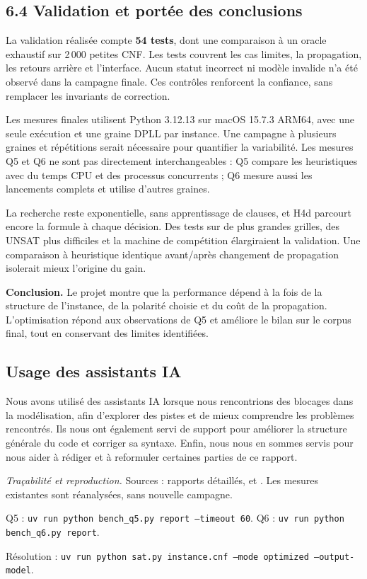 \documentclass[11pt,a4paper]{article}
\begin{document}
\subsection*{6.4 Validation et portée des conclusions}

La validation réalisée compte \textbf{54 tests}, dont une comparaison à
un oracle exhaustif sur 2\,000 petites CNF. Les tests couvrent les cas
limites, la propagation, les retours arrière et l'interface. Aucun statut
incorrect ni modèle invalide n'a été observé dans la campagne finale.
Ces contrôles renforcent la confiance, sans remplacer les invariants
de correction.

Les mesures finales utilisent Python 3.12.13 sur macOS 15.7.3 ARM64,
avec une seule exécution et une graine DPLL par instance. Une campagne
à plusieurs graines et répétitions serait nécessaire pour quantifier
la variabilité. Les mesures Q5 et Q6 ne sont pas directement interchangeables :
Q5 compare les heuristiques avec du temps CPU et des processus concurrents ;
Q6 mesure aussi les lancements complets et utilise d'autres graines.

La recherche reste exponentielle, sans apprentissage de clauses, et H4d
parcourt encore la formule à chaque décision. Des tests sur de plus grandes
grilles, des UNSAT plus difficiles et la machine de compétition élargiraient
la validation. Une comparaison à heuristique identique avant/après
changement de propagation isolerait mieux l'origine du gain.

\textbf{Conclusion.} Le projet montre que la performance dépend à la fois
de la structure de l'instance, de la polarité choisie et du coût de la
propagation. L'optimisation répond aux observations de Q5 et améliore
le bilan sur le corpus final, tout en conservant des limites identifiées.

\subsection*{Usage des assistants IA}

Nous avons utilisé des assistants IA lorsque nous rencontrions des blocages
dans la modélisation, afin d'explorer des pistes et de mieux comprendre les
problèmes rencontrés. Ils nous ont également servi de support pour améliorer
la structure générale du code et corriger sa syntaxe. Enfin, nous nous en
sommes servis pour nous aider à rédiger et à reformuler certaines parties de
ce rapport.

\vfill
{\footnotesize\textit{Traçabilité et reproduction.} Sources : rapports détaillés,
 et .
Les mesures existantes sont réanalysées, sans nouvelle campagne.
\par
Q5 : \texttt{uv run python bench\_q5.py report --timeout 60}.
Q6 : \texttt{uv run python bench\_q6.py report}.
\par
Résolution : \texttt{uv run python sat.py instance.cnf --mode optimized --output-model}.}
\label{fin-rapport}
\end{document}
